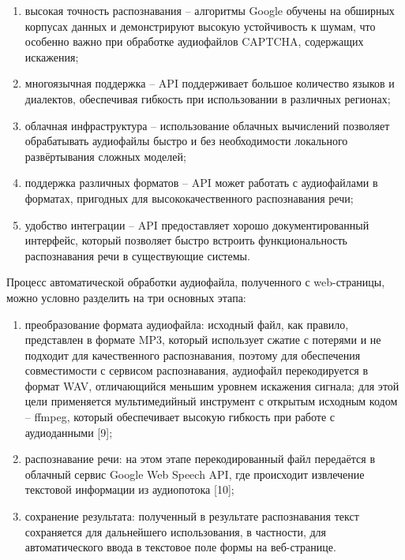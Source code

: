 \begin{enumerate}
    \item высокая точность распознавания -- алгоритмы Google обучены на обширных 
    корпусах данных и демонстрируют высокую устойчивость к шумам, что особенно 
    важно при обработке аудиофайлов CAPTCHA, содержащих искажения;
    \item многоязычная поддержка -- API поддерживает большое количество языков и 
    диалектов, обеспечивая гибкость при использовании в различных регионах;
    \item облачная инфраструктура -- использование облачных вычислений позволяет 
    обрабатывать аудиофайлы быстро и без необходимости локального развёртывания 
    сложных моделей;
    \item поддержка различных форматов -- API может работать с аудиофайлами в 
    форматах, пригодных для высококачественного распознавания речи;
    \item удобство интеграции -- API предоставляет хорошо документированный 
    интерфейс, который позволяет быстро встроить функциональность распознавания 
    речи в существующие системы.
\end{enumerate}

Процесс автоматической обработки аудиофайла, полученного с web-страницы, можно 
условно разделить на три основных этапа:

\begin{enumerate}
    \item преобразование формата аудиофайла: исходный файл, как правило, 
    представлен в формате MP3, который использует сжатие с потерями и не подходит 
    для качественного распознавания, поэтому для обеспечения совместимости с 
    сервисом распознавания, аудиофайл перекодируется в формат WAV, отличающийся 
    меньшим уровнем искажения сигнала; для этой цели применяется мультимедийный 
    инструмент с открытым исходным кодом -- ffmpeg, который обеспечивает высокую 
    гибкость при работе с аудиоданными [9];
    \item распознавание речи: на этом этапе перекодированный файл передаётся в 
    облачный сервис Google Web Speech API, где происходит извлечение текстовой 
    информации из аудиопотока [10];
    \item сохранение результата: полученный в результате распознавания текст 
    сохраняется для дальнейшего использования, в частности, для автоматического 
    ввода в текстовое поле формы на веб-странице.
\end{enumerate}

